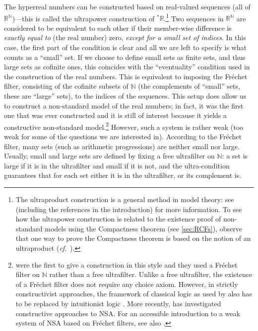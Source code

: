 The hyperreal numbers can be constructed based on real-valued sequences (all of $\mathbb{R}^\mathbb{N}$)---this is called the ultrapower construction of ${^\ast\mathbb{R}}$.\footnote{The ultraproduct construction is a general method in model theory: see \citet{Keisler:2010} (including the references in the introduction) for more information. To see how the ultrapower construction is related to the existence proof of non-standard models using the Compactness theorem (see \autoref{sec:RCFs}), observe that one way to prove the Compactness theorem is based on the notion of an ultraproduct (\textit{cf}.\ \citealp[p.~11]{Goldblatt:1998}).} Two sequences in $\mathbb{R}^\mathbb{N}$ are considered to be equivalent to each other if their member-wise difference is \textit{exactly equal to} (the real number) zero, \textit{except for a small set of indices}. In this case, the first part of the condition is clear and all we are left to specify is what counts as a ``small'' set. If we choose to define small sets as finite sets, and thus large sets as cofinite ones, this coincides with the ``eventuality'' condition used in the construction of the real numbers. This is equivalent to imposing the Fr\'{e}chet filter, consisting of the cofinite subsets of $\mathbb{N}$ (the complements of ``small'' sets, these are ``large'' sets), to the indices of the sequences. This setup does allow us to construct a non-standard model of the real numbers; in fact, it was the first one that was ever constructed and it is still of interest because it yields a constructive non-standard model.\footnote{\citet{SchmiedenLaugwitz:1958} were the first to give a construction in this style and they used a Fr\'{e}chet filter on $\mathbb{N}$ rather than a free ultrafilter. Unlike a free ultrafilter, the existence of a Fr\'{e}chet filter does not require any choice axiom. However, in strictly constructivist approaches, the framework of classical logic as used by \citet{SchmiedenLaugwitz:1958} also has to be replaced by intuitionist logic \citep{Martin-Lof:1990}. More recently, \citet{Palmgren:1998} has investigated constructive approaches to NSA. For an accessible introduction to a weak system of NSA based on Fr\'{e}chet filters, see also \citet{Tao:2012}.} However, such a system is rather weak (too weak for some of the questions we are interested in). According to the Fr\'{e}chet filter, many sets (such as arithmetic progressions) are neither small nor large. Usually, small and large sets are defined by fixing a free ultrafilter on $\mathbb{N}$: a set is large if it is in the ultrafilter and small if it is not, and the ultra-condition guarantees that for each set either it is in the ultrafilter, or its complement is.

